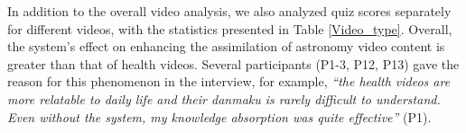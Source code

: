 

In addition to the overall video analysis, we also analyzed quiz scores separately for different videos, with the statistics presented in Table \ref{Video_type}.
Overall, the system's effect on enhancing the assimilation of astronomy video content is greater than that of health videos. 
Several participants (P1-3, P12, P13) gave the reason for this phenomenon in the interview, for example, \textit{``the health videos are more relatable to daily life and their danmaku is rarely difficult to understand. Even without the system, my knowledge absorption was quite effective''} (P1).

